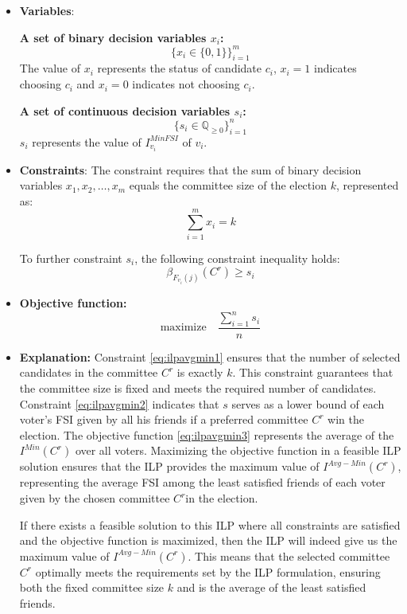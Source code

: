 \documentclass{article}
\begin{document}
\begin{itemize}

  \item \textbf{Variables}: 

\textbf{A set of binary decision variables $x_i$:} \[ \bigg\{ x_i \in \{0, 1\} \bigg\}_{i=1}^m \] The value of $x_i$ represents the status of candidate $c_i$, \(x_i = 1\) indicates choosing $c_i$ and \(x_i = 0\) indicates not choosing $c_i$.

\textbf{A set of continuous decision variables $s_i$:} 
\[ \bigg\{ s_i \in \mathbb{Q}_{\geq 0} \bigg\}_{i=1}^n \] 
$s_i$ represents the value of $I_{v_i}^{MinFSI}$ of \(v_i\).
    \item \textbf{Constraints}:
The constraint requires that the sum of binary decision variables \(x_1, x_2, \ldots, x_m\) equals the committee size of the election \(k\), represented as:
\begin{equation} \sum_{i=1}^m x_i = k \label{eq:ilpavgmin1}
\end{equation}

To further constraint $s_i$, the following constraint inequality holds:
\begin{equation} \beta_{F_{v_i}(j)}(C^{r}) \geq s_i  \label{eq:ilpavgmin2}
\end{equation}
  
  \item  \textbf{Objective function:}
  \begin{equation}\text{maximize} \quad \frac{\sum_{i=1}^{n} s_i}{n} \label{eq:ilpavgmin3}
\end{equation}
\item  \textbf{Explanation:}
Constraint \ref{eq:ilpavgmin1} ensures that the number of selected candidates in the committee \(C^r\) is exactly \(k\). This constraint guarantees that the committee size is fixed and meets the required number of candidates.
Constraint \ref{eq:ilpavgmin2} indicates that \(s\) serves as a lower bound of each voter's FSI given by all his friends if a preferred committee \(C^r\) win the election.
The objective function \ref{eq:ilpavgmin3} represents the average of the $I^{Min}(C^{r})$ over all voters. Maximizing  the objective function in a feasible ILP solution ensures that the ILP provides the maximum value of \(I^{Avg-Min}(C^{r})\), representing the average FSI among the least satisfied friends of each voter given by the chosen committee \(C^r\)in the election. 

If there exists a feasible solution to this ILP where all constraints are satisfied and the objective function is maximized, then the ILP will indeed give us the maximum value of \(I^{Avg-Min}(C^{r})\). This means that the selected committee \(C^r\) optimally meets the requirements set by the ILP formulation, ensuring both the fixed committee size \(k\) and is the average of the least satisfied friends. 
\end{itemize}
\end{document}

